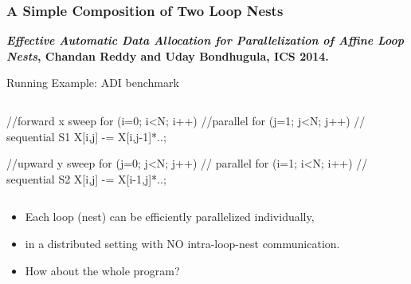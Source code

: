 \documentclass{beamer}
\newcommand{\emp}[1]{\textcolor{DikuRed}{ #1}}
\newcommand{\emphh}[1]{\textcolor{CosGreen}{ #1}}
\begin{document}
\begin{frame}[fragile,t]
  \frametitle{A Simple Composition of Two Loop Nests}

{\bf{\em Effective Automatic Data Allocation for Parallelization of Affine Loop Nests}, Chandan Reddy and Uday Bondhugula, ICS 2014.}

\begin{block}{Running Example: ADI benchmark}
\begin{columns}
\begin{colorcode}
//forward x sweep
\emphh{for (i=0; i<N; i++)}  //parallel
    \emp{for (j=1; j<N; j++)} // sequential
S1      X[i,j] -= X[i,j-1]*..;

//upward y sweep
\emphh{for (j=0; j<N; j++)} // parallel
    \emp{for (i=1; i<N; i++)} // sequential
S2      X[i,j] -= X[i-1,j]*..;
\end{colorcode}
\end{columns}
\end{block} 
 
\begin{itemize}
    \item Each loop (nest) can be \emphh{efficiently} parallelized \alert{individually},
    \item in a distributed setting with \emphh{NO intra-loop-nest communication}.
    \item \alert{How about the whole program?}
\end  {itemize}

\end{frame}
\end{document}
